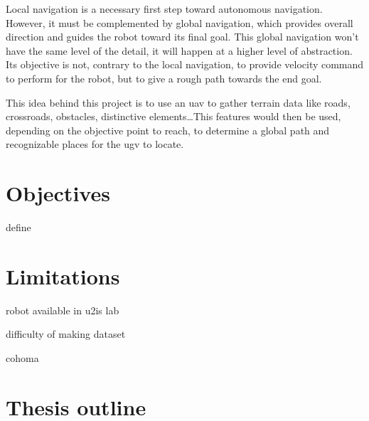 Local navigation is a necessary first step toward autonomous navigation.
However, it must be complemented by global navigation, which provides overall direction and guides the robot toward its final goal.
This global navigation won't have the same level of the detail, it will happen at a higher level of abstraction.
Its objective is not, contrary to the local navigation, to provide velocity command to perform for the robot, but
to give a rough path towards the end goal.


This idea behind this project is to use an \gls{uav} to gather terrain data like roads, crossroads, obstacles, distinctive
elements\ldots This features would then be used, depending on the objective point to reach, to determine a global
path and recognizable places for the \gls{ugv} to locate.


\section{Objectives}

define


\section{Limitations}\label{sec:limitations}


robot available in u2is lab

difficulty of making dataset

cohoma

\section{Thesis outline}

